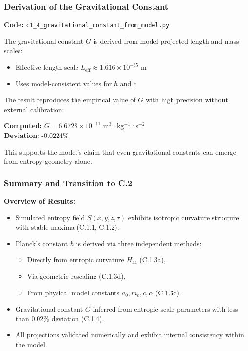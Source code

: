 \documentclass[10.5pt,a4paper]{article}
\begin{document}
\subsubsection{Derivation of the Gravitational Constant}

\noindent\textbf{Code:} \texttt{c1\_4\_gravitational\_constant\_from\_model.py}

The gravitational constant \( G \) is derived from model-projected length and mass scales:

\begin{itemize}
    \item Effective length scale \( L_{\text{eff}} \approx 1.616 \times 10^{-35} \) m
    \item Uses model-consistent values for \( \hbar \) and \( c \)
\end{itemize}

The result reproduces the empirical value of \( G \) with high precision without external calibration:

\medskip

\noindent\textbf{Computed:} \( G = 6.6728 \times 10^{-11} \) m\(^3\)·kg\(^{-1}\)·s\(^{-2}\)\\
\textbf{Deviation:} -0.0224\%

This supports the model’s claim that even gravitational constants can emerge from entropy geometry alone.

\subsubsection{Summary and Transition to C.2}

\noindent\textbf{Overview of Results:}

\begin{itemize}
    \item Simulated entropy field \( S(x, y, z, \tau) \) exhibits isotropic curvature structure with stable maxima (C.1.1, C.1.2).
    \item Planck’s constant \( \hbar \) is derived via three independent methods:
    \begin{itemize}
        \item Directly from entropic curvature \( H_{44} \) (C.1.3a),
        \item Via geometric rescaling (C.1.3d),
        \item From physical model constants \( a_0, m_e, c, \alpha \) (C.1.3c).
    \end{itemize}
    \item Gravitational constant \( G \) inferred from entropic scale parameters with less than 0.02\% deviation (C.1.4).
    \item All projections validated numerically and exhibit internal consistency within the model.
\end{itemize}
\end{document}
